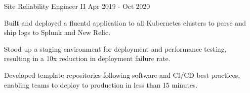 \begin{cventries}
  \cventry
    {Site Reliability Engineer II} %
    {} %
    {} %
    {Apr 2019 - Oct 2020} %
    {
      \begin{cvitems} %
        \item {Built and deployed a fluentd application to all Kubernetes clusters to parse and ship logs to Splunk and New Relic.}
        \item {Stood up a staging environment for deployment and performance testing, resulting in a 10x reduction in deployment failure rate.}
        \item {Developed template repositories following software and CI/CD best practices, enabling teams to deploy to production in less than 15 minutes.}
      \end{cvitems}
    }



\end{cventries}
